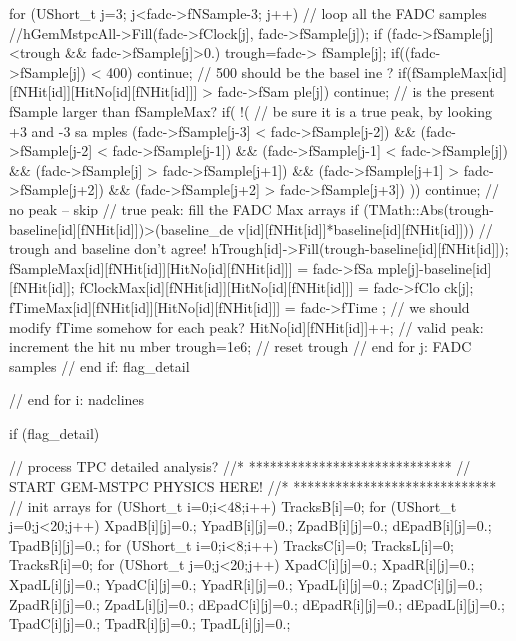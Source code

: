 \begin{DoxyCode}
{{{{{{{{{{{              for (UShort_t j=3; j<fadc->fNSample-3; j++) { // loop all the FADC 
      samples
                //hGemMstpcAll->Fill(fadc->fClock[j], fadc->fSample[j]);
                if (fadc->fSample[j]<trough && fadc->fSample[j]>0.) trough=fadc->
      fSample[j];
                if((fadc->fSample[j]) < 400) continue; // 500 should be the basel
      ine ?
                  if(fSampleMax[id][fNHit[id]][HitNo[id][fNHit[id]]] > fadc->fSam
      ple[j]) continue; // is the present fSample larger than fSampleMax?
                    if( !(  // be sure it is a true peak, by looking +3 and -3 sa
      mples
                        (fadc->fSample[j-3] < fadc->fSample[j-2]) && 
                        (fadc->fSample[j-2] < fadc->fSample[j-1]) &&
                        (fadc->fSample[j-1] < fadc->fSample[j])   &&
                        (fadc->fSample[j]   > fadc->fSample[j+1]) &&
                        (fadc->fSample[j+1] > fadc->fSample[j+2]) &&
                        (fadc->fSample[j+2] > fadc->fSample[j+3])
                        )) continue; // no peak -- skip
                      // true peak: fill the FADC Max arrays
                      if (TMath::Abs(trough-baseline[id][fNHit[id]])>(baseline_de
      v[id][fNHit[id]]*baseline[id][fNHit[id]])){ 
                        // trough and baseline don't agree!
                        hTrough[id]->Fill(trough-baseline[id][fNHit[id]]);
                      }
                      fSampleMax[id][fNHit[id]][HitNo[id][fNHit[id]]] = fadc->fSa
      mple[j]-baseline[id][fNHit[id]];
                      fClockMax[id][fNHit[id]][HitNo[id][fNHit[id]]] = fadc->fClo
      ck[j];
                      fTimeMax[id][fNHit[id]][HitNo[id][fNHit[id]]] = fadc->fTime
      ; // we should modify fTime somehow for each peak?
                      HitNo[id][fNHit[id]]++; // valid peak: increment the hit nu
      mber
                      trough=1e6; // reset trough
              } // end for j: FADC samples
          } // end if: flag_detail

        } // end for i: nadclines
   
        if (flag_detail) { // process TPC detailed analysis?
          //*  *****************************
          //   START GEM-MSTPC PHYSICS HERE!
          //*  *****************************
          // init arrays
          for (UShort_t i=0;i<48;i++){
            TracksB[i]=0; 
            for (UShort_t j=0;j<20;j++) {
              XpadB[i][j]=0.;
              YpadB[i][j]=0.;
              ZpadB[i][j]=0.;
              dEpadB[i][j]=0.;
              TpadB[i][j]=0.;
            }
          }
          for (UShort_t i=0;i<8;i++){
            TracksC[i]=0; 
            TracksL[i]=0; 
            TracksR[i]=0; 
            for (UShort_t j=0;j<20;j++) {
              XpadC[i][j]=0.;
              XpadR[i][j]=0.;
              XpadL[i][j]=0.;
              YpadC[i][j]=0.;
              YpadR[i][j]=0.;
              YpadL[i][j]=0.;
              ZpadC[i][j]=0.;
              ZpadR[i][j]=0.;
              ZpadL[i][j]=0.;
              dEpadC[i][j]=0.;
              dEpadR[i][j]=0.;
              dEpadL[i][j]=0.;
              TpadC[i][j]=0.;
              TpadR[i][j]=0.;
              TpadL[i][j]=0.;
            }
          }
          
}}}}}}}}}}
\end{DoxyCode}
